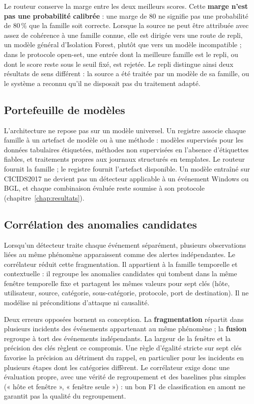 Le routeur conserve la marge entre les deux meilleurs scores. Cette \textbf{marge n'est pas une probabilité calibrée} : une marge de 80 ne signifie pas une probabilité de $80\,\%$ que la famille soit correcte. Lorsque la source ne peut être attribuée avec assez de cohérence à une famille connue, elle est dirigée vers une route de repli, un modèle général d'Isolation Forest, plutôt que vers un modèle incompatible ; dans le protocole open-set, une entrée dont la meilleure famille est le repli, ou dont le score reste sous le seuil fixé, est rejetée. Le repli distingue ainsi deux résultats de sens différent : la source a été traitée par un modèle de sa famille, ou le système a reconnu qu'il ne disposait pas du traitement adapté.

\subsection{Portefeuille de modèles}

L'architecture ne repose pas sur un modèle universel. Un registre associe chaque famille à un artefact de modèle ou à une méthode : modèles supervisés pour les données tabulaires étiquetées, méthodes non supervisées en l'absence d'étiquettes fiables, et traitements propres aux journaux structurés en templates. Le routeur fournit la famille ; le registre fournit l'artefact disponible. Un modèle entraîné sur CICIDS2017 ne devient pas un détecteur applicable à un événement Windows ou BGL, et chaque combinaison évaluée reste soumise à son protocole (chapitre~\ref{chap:resultats}).

\subsection{Corrélation des anomalies candidates}

\label{sec:modele-correlation}

Lorsqu'un détecteur traite chaque événement séparément, plusieurs observations liées au même phénomène apparaissent comme des alertes indépendantes. Le corrélateur réduit cette fragmentation. Il appartient à la famille temporelle et contextuelle : il regroupe les anomalies candidates qui tombent dans la même fenêtre temporelle fixe et partagent les mêmes valeurs pour sept clés (hôte, utilisateur, source, catégorie, sous-catégorie, protocole, port de destination). Il ne modélise ni préconditions d'attaque ni causalité.

Deux erreurs opposées bornent sa conception. La \textbf{fragmentation} répartit dans plusieurs incidents des événements appartenant au même phénomène ; la \textbf{fusion} regroupe à tort des événements indépendants. La largeur de la fenêtre et la précision des clés règlent ce compromis. Une règle d'égalité stricte sur sept clés favorise la précision au détriment du rappel, en particulier pour les incidents en plusieurs étapes dont les catégories diffèrent. Le corrélateur exige donc une évaluation propre, avec une vérité de regroupement et des baselines plus simples (« hôte et fenêtre », « fenêtre seule ») : un bon F1 de classification en amont ne garantit pas la qualité du regroupement.

